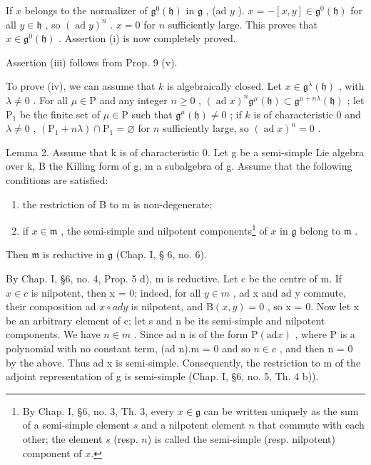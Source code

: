 If \(x\) belongs to the normalizer of \(\mathfrak{g}^0(\mathfrak{h})\) in \(\mathfrak{g}\) , (ad \(y\) ). \(x = -[x, y] \in \mathfrak{g}^0(\mathfrak{h})\) for all \(y \in \mathfrak{h}\) , so \((\operatorname{ad} y)^n\) . \(x = 0\) for \(n\) sufficiently large. This proves that \(x \in \mathfrak{g}^0(\mathfrak{h})\) . Assertion (i) is now completely proved.

Assertion (iii) follows from Prop. 9 (v).

To prove (iv), we can assume that \(k\) is algebraically closed. Let \(x \in \mathfrak{g}^{\lambda}(\mathfrak{h})\) , with \(\lambda \neq 0\) . For all \(\mu \in \mathrm{P}\) and any integer \(n \geq 0\) , \((\operatorname{ad} x)^n \mathfrak{g}^\mu(\mathfrak{h}) \subset \mathfrak{g}^{\mu + n\lambda}(\mathfrak{h})\) ; let \(\mathrm{P}_1\) be the finite set of \(\mu \in \mathrm{P}\) such that \(\mathfrak{g}^\mu(\mathfrak{h}) \neq 0\) ; if \(k\) is of characteristic 0 and \(\lambda \neq 0\) , \((\mathrm{P}_1 + n\lambda) \cap \mathrm{P}_1 = \varnothing\) for \(n\) sufficiently large, so \((\operatorname{ad} x)^n = 0\) .

Lemma 2. Assume that k is of characteristic 0. Let g be a semi-simple Lie algebra over k, B the Killing form of g, m a subalgebra of g. Assume that the following conditions are satisfied:

\begin{enumerate}
\def\labelenumi{\arabic{enumi})}
\item
  the restriction of B to m is non-degenerate;
\item
  if \(x \in \mathfrak{m}\) , the semi-simple and nilpotent components\footnote{By Chap. I, §6, no. 3, Th. 3, every \(x \in \mathfrak{g}\) can be written uniquely as the sum of a semi-simple element \(s\) and a nilpotent element \(n\) that commute with each other; the element \(s\) (resp. \(n\)) is called the semi-simple (resp. nilpotent) component of \(x\).} of \(x\) in \(\mathfrak{g}\) belong to \(\mathfrak{m}\) .
\end{enumerate}

Then \(\mathfrak{m}\) is reductive in \(\mathfrak{g}\) (Chap. I, § 6, no. 6).

By Chap. I, §6, no. 4, Prop. 5 d), m is reductive. Let c be the centre of m. If \(x \in c\) is nilpotent, then x = 0; indeed, for all \(y \in m\) , ad x and ad y commute, their composition ad \(x \circ ad y\) is nilpotent, and \(\mathrm{B}(x, y) = 0\) , so x = 0. Now let x be an arbitrary element of c; let s and n be its semi-simple and nilpotent components. We have \(n \in m\) . Since ad n is of the form \(\mathrm{P}(\mathrm{ad}x)\) , where P is a polynomial with no constant term, (ad n).m = 0 and so \(n \in c\) , and then n = 0 by the above. Thus ad x is semi-simple. Consequently, the restriction to m of the adjoint representation of g is semi-simple (Chap. I, §6, no. 5, Th. 4 b)).


